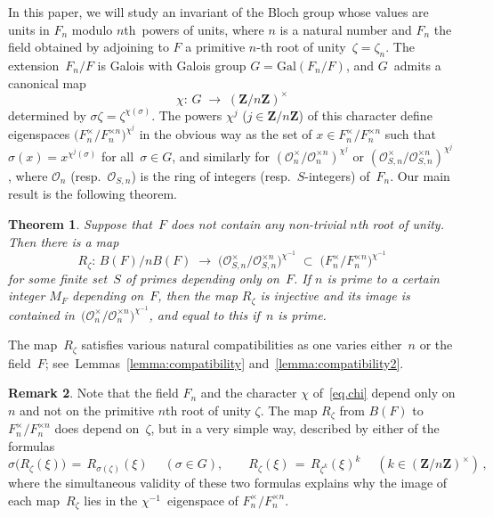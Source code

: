 \documentclass[12pt,reqno]{amsart}
\newtheorem{theorem}{Theorem}[section]
\theoremstyle{definition}
\newtheorem{remark}[theorem]{Remark}
\newcommand{\changed}[1]{{#1}}
\def\be{\begin{equation}}
\def\ee{\end{equation}}
\def\Z{\mathbf Z}   %
\def\s{\sigma} \def\a{\alpha}  \def\g{\gamma}   \def\z{\zeta}  \def\i{^{-1}}
\def\map{\;\longrightarrow\;}
\def\nn{n}
\def\Gal{\mathrm{Gal}}
\def\OL{\mathcal{O}}
\begin{document}
\smallskip

In this paper, we will study an invariant of the Bloch group whose
values are units in $F_\nn$ modulo $\nn$th~powers of units, where $\nn$ 
is a natural number and $F_\nn$ the field  obtained by adjoining to $F$ 
a primitive $\nn$-th root of unity~$\z=\z_\nn$. The extension~$F_\nn/F$ is 
Galois with Galois group $G=\Gal(F_\nn/F)$, and $G$~admits a canonical map
\be
\label{eq.chi}
\chi:\,G \map(\Z/n \Z)^{\times}
\ee
determined by $\sigma\z = \z^{\chi(\sigma)}$. The powers 
$\chi^j$ ($j\in\Z/\nn\Z$) of this character define eigenspaces 
$\bigl(F_\nn^{\times}/F_\nn^{\times \nn}\bigr)^{\chi^j}$ in the obvious way as the 
set of $x\in F_\nn^{\times}/F_\nn^{\times \nn}$ such that $\s(x)=x^{\chi^j(\s)}$ for 
all~$\s\in G$, and similarly for $(\OL_\nn^{\times}/\OL_\nn^{\times \nn})^{\chi^j}$ 
or $(\OL_{S,\nn}^{\times}/\OL_{S,\nn}^{\times \nn})^{\chi^j}$, where 
$\OL_\nn$ (resp.~$\OL_{S,\nn}$) is the ring of integers (resp.~$S$-integers)
of~$F_\nn$. Our main result is the following theorem.

\begin{theorem}
\label{thm.R} 
Suppose that~$F$ does not contain any non-trivial $n$th root of unity. 
Then there is a %
\changed{map}
\be
\label{eq.Rmap}  
R_\z:\, B(F)/\nn B(F)\map 
\bigl(\OL_{S,\nn}^{\times}/\OL_{S,\nn}^{\times \nn}\bigr)^{\chi\i}
\;\subset\;\bigl(F_\nn^{\times}/F_\nn^{\times \nn}\bigr)^{\chi\i}
\ee
for some finite set~$S$ of primes depending only on~$F$.  If $\nn$ is prime 
to a certain integer $M_F$ depending on~$F$, then the map $R_\z$ is injective 
and its image is contained 
in~$\bigl(\OL_\nn^{\times}/\OL_\nn^{\times \nn}\bigr)^{\chi\i}$,
and equal to this if~$\nn$ is prime.
\end{theorem}

\changed{The map~$R_{\z}$ satisfies various natural compatibilities as one varies
either~$\nn$ or the field~$F$; see~Lemmas~\ref{lemma:compatibility}
and~\ref{lemma:compatibility2}.} 


\begin{remark}
Note that the field $F_\nn$ and the character $\chi$ of~\eqref{eq.chi} \changed{depend
only on $\nn$ and not on the primitive} $\nn$th root of unity $\z$. The map $R_\z$ 
from $B(F)$ to $F_\nn^{\times}/F_\nn^{\times\nn}$ does depend on~$\z$, but in a 
very simple way, described by either of the formulas
\be
\label{eq.2actions}
\s\bigl(R_\z(\xi)\bigr)\,=\,R_{\s(\z)}(\xi)\;\quad(\s\in G),\qquad
R_\z(\xi) \,=\,R_{\z^k}(\xi)^k \quad\;(k\in(\Z/\nn\Z)^\times)\,, 
\ee
where the simultaneous validity of these two formulas explains why the image 
of each map~$R_\z$ lies in the $\chi\i$~eigenspace of 
$F_\nn^{\times}/F_\nn^{\times\nn}$.
\end{remark}
\end{document}
